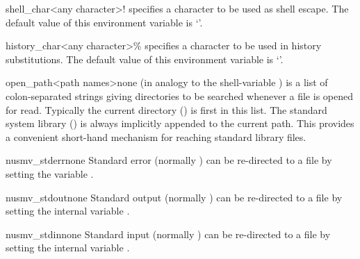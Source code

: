 \begin{nusmvVar}{shell\_char}{<any character>}{!}
 specifies a character to be used as shell escape.
The default value of this environment variable is `\varvalue{!}'.
\end{nusmvVar}

\begin{nusmvVar} {history\_char}{<any character>}{\%}
 specifies a character to be used in history
substitutions.
The default value of this environment variable is `\varvalue{\%}'.
\end{nusmvVar}

\begin{nusmvVar} {open\_path}{<path names>}{none}
 (in analogy to the shell-variable ) is a
list of colon-separated strings giving directories to be searched
whenever a file is opened for read. Typically the current directory
() is first in this list. The standard system library
(\stdsyslib) \vindex{\stdsyslib}
is always implicitly appended to the current path. This provides a
convenient short-hand mechanism for reaching standard library files.
\end{nusmvVar}

\begin{nusmvVar} {nusmv\_stderr}{}{none}
Standard error (normally ) can be re-directed to a file
by setting the variable .
\end{nusmvVar}

\begin{nusmvVar} {nusmv\_stdout}{}{none}
Standard output (normally ) can be re-directed to a file
by setting the internal variable .
\end{nusmvVar}

\begin{nusmvVar} {nusmv\_stdin}{}{none}
Standard input (normally ) can be re-directed to a file
by setting the internal variable .
\end{nusmvVar}

